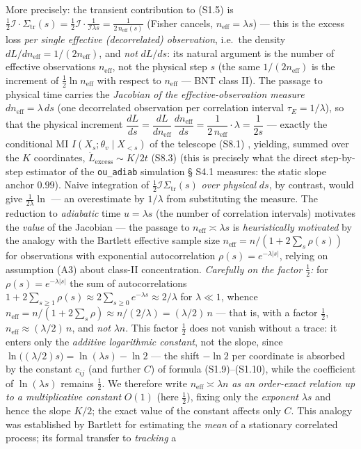 \documentclass[12pt]{iopart}
\providecommand{\lt}{<}\providecommand{\gt}{>}
\begin{document}
More precisely: the transient contribution to (S1.5) is \(\tfrac12\mathcal I\cdot\Sigma_{\text{tr}}(s) = \tfrac12\mathcal I\cdot\frac{1}{\mathcal I\lambda s} = \frac{1}{2\,n_{\text{eff}}(s)}\) (Fisher cancels, \(n_{\text{eff}} = \lambda s\)) --- this is the excess loss \emph{per single effective (decorrelated) observation}, i.e.~the density \(dL/dn_{\text{eff}} = 1/(2n_{\text{eff}})\), and \emph{not} \(dL/ds\): its natural argument is the number of effective observations \(n_{\text{eff}}\), not the physical step \(s\) (the same \(1/(2n_{\text{eff}})\) is the increment of \(\tfrac12\ln n_{\text{eff}}\) with respect to \(n_{\text{eff}}\) --- BNT class II). The passage to physical time carries the \emph{Jacobian of the effective-observation measure} \(dn_{\text{eff}} = \lambda\,ds\) (one decorrelated observation per correlation interval \(\tau_E = 1/\lambda\)), so that the physical increment \(\dfrac{dL}{ds} = \dfrac{dL}{dn_{\text{eff}}}\,\dfrac{dn_{\text{eff}}}{ds} = \dfrac{1}{2\,n_{\text{eff}}}\cdot\lambda = \dfrac{1}{2s}\) --- exactly the conditional MI \(I(X_s;\theta_v\mid X_{\lt s})\) of the telescope (S8.1) \cite{Andriishin2026b}, yielding, summed over the \(K\) coordinates, \(\dot L_{\text{excess}}\sim K/2t\) (S8.3) \cite{Andriishin2026b} (this is precisely what the direct step-by-step estimator of the \texttt{ou\_adiab} simulation § S4.1 measures: the static slope anchor \(0.99\)). Naive integration of \(\tfrac12\mathcal I\Sigma_{\text{tr}}(s)\) \emph{over physical} \(ds\), by contrast, would give \(\tfrac{1}{2\lambda}\ln\) --- an overestimate by \(1/\lambda\) from substituting the measure. The reduction to \emph{adiabatic} time \(u = \lambda s\) (the number of correlation intervals) motivates the \emph{value} of the Jacobian --- the passage to \(n_{\text{eff}} \asymp \lambda s\) is \emph{heuristically motivated} by the analogy with the Bartlett effective sample size \(n_{\text{eff}} = n/(1+2\sum_s\rho(s))\) \cite{Bartlett1946} for observations with exponential autocorrelation \(\rho(s) = e^{-\lambda|s|}\), relying on assumption (A3) about class-II concentration. \emph{Carefully on the factor \(\tfrac12\):} for \(\rho(s) = e^{-\lambda|s|}\) the sum of autocorrelations \(1 + 2\sum_{s\ge1}\rho(s) \approx 2\sum_{s\ge0}e^{-\lambda s} \approx 2/\lambda\) for \(\lambda \ll 1\), whence \(n_{\text{eff}} = n/(1+2\sum_s\rho) \approx n/(2/\lambda) = (\lambda/2)\,n\) --- that is, with a factor \(\tfrac12\), \(n_{\text{eff}} \approx (\lambda/2)\,n\), and \emph{not} \(\lambda n\). This factor \(\tfrac12\) does not vanish without a trace: it enters only the \emph{additive logarithmic constant}, not the slope, since \(\ln\big((\lambda/2)s\big) = \ln(\lambda s) - \ln 2\) --- the shift \(-\ln 2\) per coordinate is absorbed by the constant \(c_{ij}\) (and further \(C\)) of formula (S1.9)--(S1.10), while the coefficient of \(\ln(\lambda s)\) remains \(\tfrac12\). We therefore write \(n_{\text{eff}} \asymp \lambda n\) \emph{as an order-exact relation up to a multiplicative constant} \(O(1)\) (here \(\tfrac12\)), fixing only the \emph{exponent} \(\lambda s\) and hence the slope \(K/2\); the exact value of the constant affects only \(C\). This analogy was established by Bartlett for estimating the \emph{mean} of a stationary correlated process; its formal transfer to \emph{tracking} a 
\end{document}
